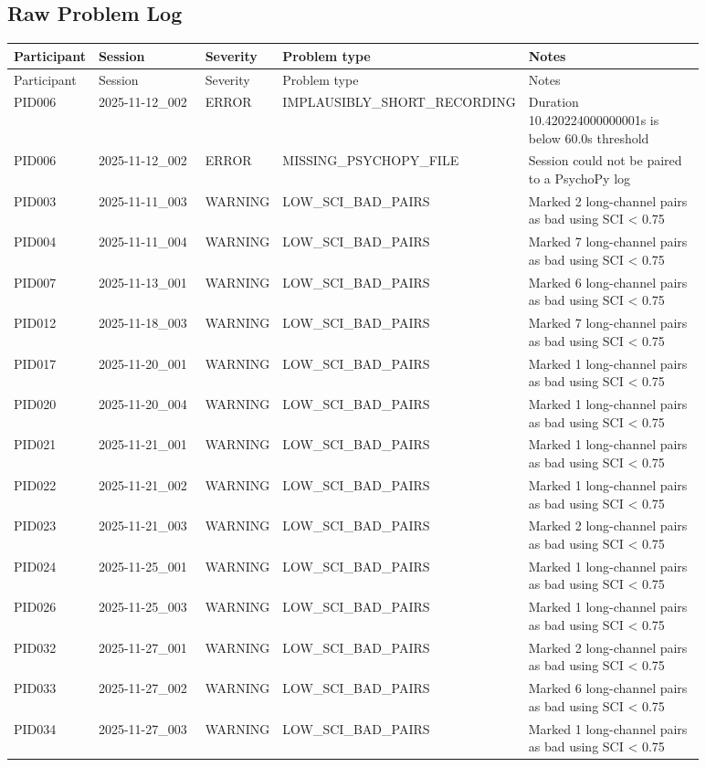 \documentclass[11pt]{article}
\begin{document}
\subsection*{Raw Problem Log}
\begin{longtable}{p{0.10\linewidth}p{0.18\linewidth}p{0.10\linewidth}p{0.22\linewidth}p{0.28\linewidth}}
\toprule
Participant & Session & Severity & Problem type & Notes\\
\midrule
\endfirsthead
\toprule
Participant & Session & Severity & Problem type & Notes\\
\midrule
\endhead
PID006 & 2025-11-12\_002 & ERROR & IMPLAUSIBLY\_SHORT\_RECORDING & Duration 10.420224000000001s is below 60.0s threshold\\
PID006 & 2025-11-12\_002 & ERROR & MISSING\_PSYCHOPY\_FILE & Session could not be paired to a PsychoPy log\\
PID003 & 2025-11-11\_003 & WARNING & LOW\_SCI\_BAD\_PAIRS & Marked 2 long-channel pairs as bad using SCI < 0.75\\
PID004 & 2025-11-11\_004 & WARNING & LOW\_SCI\_BAD\_PAIRS & Marked 7 long-channel pairs as bad using SCI < 0.75\\
PID007 & 2025-11-13\_001 & WARNING & LOW\_SCI\_BAD\_PAIRS & Marked 6 long-channel pairs as bad using SCI < 0.75\\
PID012 & 2025-11-18\_003 & WARNING & LOW\_SCI\_BAD\_PAIRS & Marked 7 long-channel pairs as bad using SCI < 0.75\\
PID017 & 2025-11-20\_001 & WARNING & LOW\_SCI\_BAD\_PAIRS & Marked 1 long-channel pairs as bad using SCI < 0.75\\
PID020 & 2025-11-20\_004 & WARNING & LOW\_SCI\_BAD\_PAIRS & Marked 1 long-channel pairs as bad using SCI < 0.75\\
PID021 & 2025-11-21\_001 & WARNING & LOW\_SCI\_BAD\_PAIRS & Marked 1 long-channel pairs as bad using SCI < 0.75\\
PID022 & 2025-11-21\_002 & WARNING & LOW\_SCI\_BAD\_PAIRS & Marked 1 long-channel pairs as bad using SCI < 0.75\\
PID023 & 2025-11-21\_003 & WARNING & LOW\_SCI\_BAD\_PAIRS & Marked 2 long-channel pairs as bad using SCI < 0.75\\
PID024 & 2025-11-25\_001 & WARNING & LOW\_SCI\_BAD\_PAIRS & Marked 1 long-channel pairs as bad using SCI < 0.75\\
PID026 & 2025-11-25\_003 & WARNING & LOW\_SCI\_BAD\_PAIRS & Marked 1 long-channel pairs as bad using SCI < 0.75\\
PID032 & 2025-11-27\_001 & WARNING & LOW\_SCI\_BAD\_PAIRS & Marked 2 long-channel pairs as bad using SCI < 0.75\\
PID033 & 2025-11-27\_002 & WARNING & LOW\_SCI\_BAD\_PAIRS & Marked 6 long-channel pairs as bad using SCI < 0.75\\
PID034 & 2025-11-27\_003 & WARNING & LOW\_SCI\_BAD\_PAIRS & Marked 1 long-channel pairs as bad using SCI < 0.75\\
\bottomrule
\end{longtable}
\end{document}
